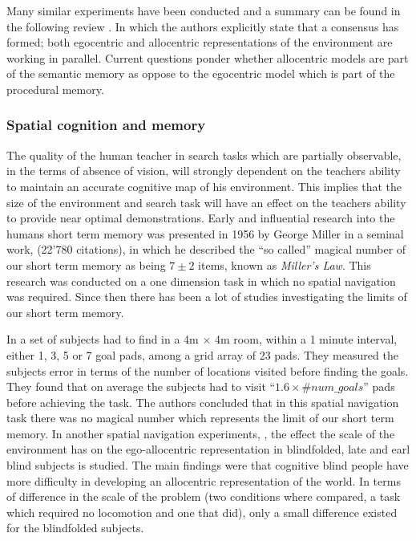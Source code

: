 Many similar experiments have been conducted and a summary can be found in the following review \cite{spatial_memory_how_ego_allo_combine_2006}.
In which the authors explicitly state that a consensus has formed; both egocentric and allocentric representations of the environment are 
working in parallel. Current questions ponder whether allocentric models are part of the semantic memory as oppose to the egocentric model 
which is part of the procedural memory.

\subsubsection{Spatial cognition and memory}

The quality of the human teacher in  search tasks which are partially observable, in the terms of absence of vision,
will strongly dependent on the teachers ability to maintain an accurate cognitive map of his environment. This implies
that the size of the environment and search task will have an effect on the teachers ability to provide near optimal 
demonstrations. 
Early and influential research into the humans short term memory was presented in 1956 by George Miller in a seminal work, \cite{cogprints730} 
(22'780 citations), in which he described the ``so called'' magical number of our short term memory as being $7\pm2$ items, 
known as \textit{Miller's Law}. This research was conducted on a one dimension task in which no spatial navigation was required.
Since then there has been a lot of studies investigating the limits of our short term memory.

In \cite{human_stsm_2015} a set of subjects had to find in a 4m $\times$ 4m room, within a 1 minute interval, either 1, 3, 5 or 7 goal pads, among 
a grid array of 23 pads. They measured the subjects error
in terms of the number of locations visited before finding the goals. They found that on average the subjects
had to visit ``$1.6 \times \#num\_goals$'' pads before achieving the task. The authors concluded that in 
this spatial navigation task there was no magical number which represents the limit of our short term memory.
In another spatial navigation experiments, \cite{Iachini2014}, the effect the scale of the environment 
has on the ego-allocentric representation in blindfolded, late and earl blind subjects is studied. The main findings were
that cognitive blind people have more difficulty in developing an allocentric representation of the world. In terms of 
difference in the scale of the problem (two conditions where compared, a task which required no locomotion and one that did), 
only a small difference existed for the blindfolded subjects.

